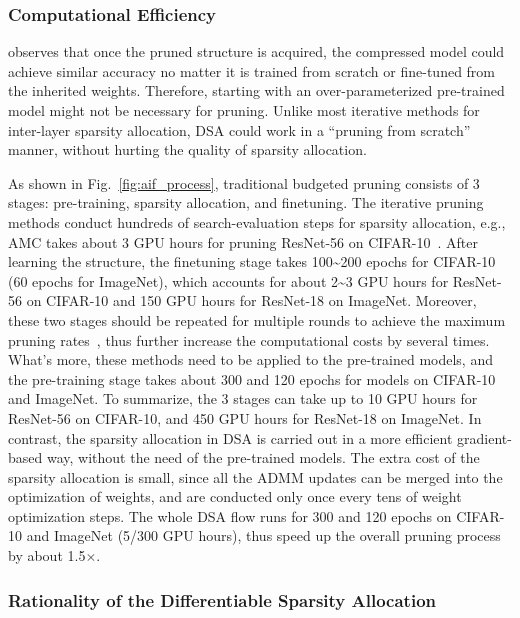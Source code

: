 \documentclass[runningheads]{llncs}
\newcommand{\dsa}{DSA\xspace}
\begin{document}
  \subsubsection{Computational Efficiency}
  
  
  \cite{rethinking} observes that once the pruned structure is acquired, the compressed model could achieve similar accuracy no matter it is trained from scratch or fine-tuned from the inherited weights. Therefore, starting with an over-parameterized pre-trained model might not be necessary for pruning. Unlike most iterative methods for inter-layer sparsity allocation, \dsa could work in a ``pruning from scratch'' manner, without hurting the quality of sparsity allocation. 
  
  As shown in Fig.~\ref{fig:aif_process}, traditional budgeted pruning consists of 3 stages: pre-training, sparsity allocation, and finetuning. 
  The iterative pruning methods conduct hundreds of search-evaluation steps for sparsity allocation, e.g., AMC takes about 3 GPU hours for pruning ResNet-56 on CIFAR-10~\cite{PFS}. After learning the structure, the finetuning stage takes 100\~{}200 epochs for CIFAR-10 (60 epochs for ImageNet), which accounts for about 2\~{}3 GPU hours for ResNet-56 on CIFAR-10 and 150 GPU hours for ResNet-18 on ImageNet. Moreover, these two stages should be repeated for multiple rounds to achieve the maximum pruning rates~\cite{netadapt,autocompress}, thus further increase the computational costs by several times. 
  What's more, these methods need to be applied to the pre-trained models, and the pre-training stage takes about 300 and 120 epochs for models on CIFAR-10 and ImageNet. To summarize, the 3 stages can take up to 10 GPU hours for ResNet-56 on CIFAR-10, and 450 GPU hours for ResNet-18 on ImageNet. 
  In contrast, the sparsity allocation in DSA is carried out in a more efficient gradient-based way, without the need of the pre-trained models. The extra cost of the sparsity allocation is small, since all the ADMM updates can be merged into the optimization of weights, and are conducted only once every tens of weight optimization steps. 
  The whole DSA flow runs for 300 and 120 epochs on CIFAR-10 and ImageNet (5/300 GPU hours), thus speed up the overall pruning process by about 1.5$\times$.  
  
  
  \subsubsection{Rationality of the Differentiable Sparsity Allocation}
  \label{sec:rational}
  
\end{document}
